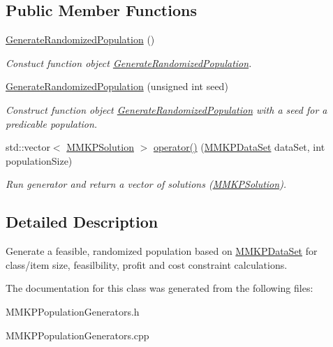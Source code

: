 \subsection*{Public Member Functions}
\begin{DoxyCompactItemize}
\item 
\hypertarget{class_generate_randomized_population_aa720b865e885c3a2de5ae3a04569648c}{\hyperlink{class_generate_randomized_population_aa720b865e885c3a2de5ae3a04569648c}{Generate\+Randomized\+Population} ()}\label{class_generate_randomized_population_aa720b865e885c3a2de5ae3a04569648c}

\begin{DoxyCompactList}\small\item\em Constuct function object \hyperlink{class_generate_randomized_population}{Generate\+Randomized\+Population}. \end{DoxyCompactList}\item 
\hypertarget{class_generate_randomized_population_af909ed6bb075e123d4b17f585bddcbf2}{\hyperlink{class_generate_randomized_population_af909ed6bb075e123d4b17f585bddcbf2}{Generate\+Randomized\+Population} (unsigned int seed)}\label{class_generate_randomized_population_af909ed6bb075e123d4b17f585bddcbf2}

\begin{DoxyCompactList}\small\item\em Construct function object \hyperlink{class_generate_randomized_population}{Generate\+Randomized\+Population} with a seed for a predicable population. \end{DoxyCompactList}\item 
\hypertarget{class_generate_randomized_population_ad8183d231b576c56527b350c31cc384d}{std\+::vector$<$ \hyperlink{class_m_m_k_p_solution}{M\+M\+K\+P\+Solution} $>$ \hyperlink{class_generate_randomized_population_ad8183d231b576c56527b350c31cc384d}{operator()} (\hyperlink{class_m_m_k_p_data_set}{M\+M\+K\+P\+Data\+Set} data\+Set, int population\+Size)}\label{class_generate_randomized_population_ad8183d231b576c56527b350c31cc384d}

\begin{DoxyCompactList}\small\item\em Run generator and return a vector of solutions (\hyperlink{class_m_m_k_p_solution}{M\+M\+K\+P\+Solution}). \end{DoxyCompactList}\end{DoxyCompactItemize}


\subsection{Detailed Description}
Generate a feasible, randomized population based on \hyperlink{class_m_m_k_p_data_set}{M\+M\+K\+P\+Data\+Set} for class/item size, feasilbility, profit and cost constraint calculations. 

The documentation for this class was generated from the following files\+:\begin{DoxyCompactItemize}
\item 
M\+M\+K\+P\+Population\+Generators.\+h\item 
M\+M\+K\+P\+Population\+Generators.\+cpp\end{DoxyCompactItemize}

